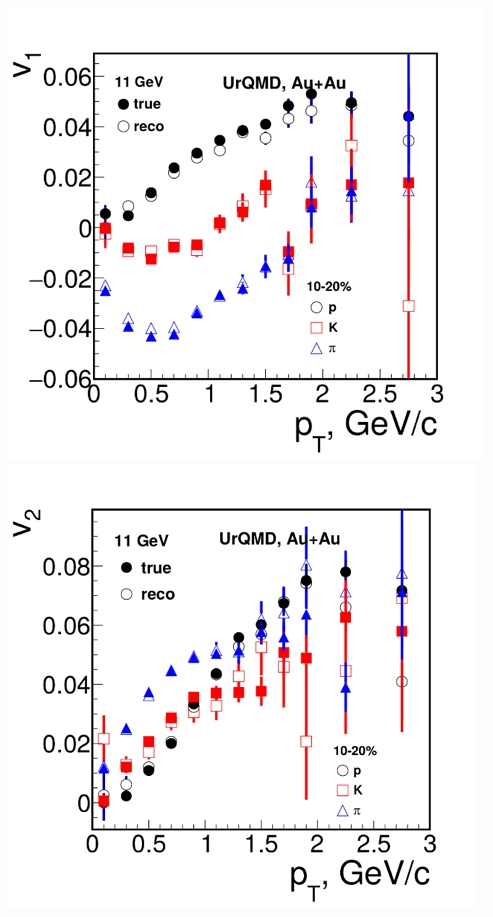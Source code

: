 \documentclass[dvipsnames] {beamer}
\begin{document}
\begin{frame}{}
\begin{columns}[t]
\begin{block}{\bf {}}
    \end{block}
     \begin{block}{\bf {}}
       \includegraphics[width=1.\linewidth]{v1.png} \\
       \includegraphics[width=1.\linewidth]{v2.png}

\end{block}
\end{columns}
\end{frame}
\end{document}
